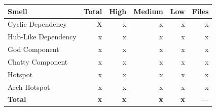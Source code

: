 \begin{tabular}{l|r|r|r|r|r}
\hline
\textbf{Smell} & \textbf{Total} & \textbf{High} & \textbf{Medium} & \textbf{Low} & \textbf{Files} \\
\hline
Cyclic Dependency & X & x & x & x & x \\
Hub-Like Dependency & x & x & x & x & x \\
God Component & x & x & x & x & x \\
Chatty Component & x & x & x & x & x \\
Hotspot & x & x & x & x & x \\
Arch Hotspot & x & x & x & x & x \\
\hline
\textbf{Total}       & \textbf{x} & \textbf{x} & \textbf{x} & \textbf{x} & --- \\
\hline
\end{tabular}